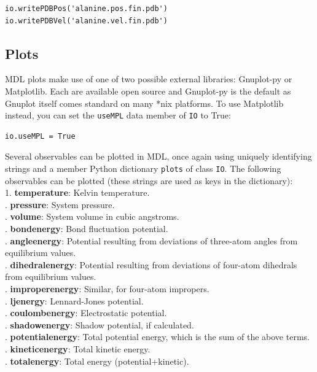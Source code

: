 \documentclass[11pt]{report}
\begin{document}
\begin{verbatim}
io.writePDBPos('alanine.pos.fin.pdb')
io.writePDBVel('alanine.vel.fin.pdb')
\end{verbatim}


\subsection{Plots}

MDL plots make use of one of two possible external libraries: Gnuplot-py
or Matplotlib.  Each are available open source and Gnuplot-py is the default
as Gnuplot itself comes standard on many *nix platforms.  To use Matplotlib
instead, you can set the \texttt{useMPL} data member of \texttt{IO} to True:

\begin{verbatim}
io.useMPL = True
\end{verbatim}

Several observables can be plotted in MDL, once again using uniquely 
identifying strings and a member Python dictionary \texttt{plots} of class
\texttt{IO}.  The following observables can be plotted (these strings are
used as keys in the dictionary):\\

1. {\bf temperature}: Kelvin temperature. \\
. {\bf pressure}: System pressure. \\
. {\bf volume}: System volume in cubic angstroms. \\
. {\bf bondenergy}: Bond fluctuation potential. \\
. {\bf angleenergy}: Potential resulting from deviations
of three-atom angles from equilibrium values. \\
. {\bf dihedralenergy}: Potential resulting from deviations
of four-atom dihedrals from equilibrium values. \\
. {\bf improperenergy}: Similar, for four-atom impropers. \\
. {\bf ljenergy}: Lennard-Jones potential. \\
. {\bf coulombenergy}: Electrostatic potential. \\
. {\bf shadowenergy}: Shadow potential, if calculated. \\
. {\bf potentialenergy}: Total potential energy, which is the sum
of the above terms. \\
. {\bf kineticenergy}: Total kinetic energy. \\
. {\bf totalenergy}: Total energy (potential+kinetic). \\
\end{document}
